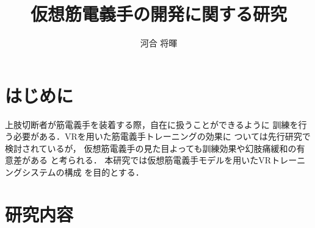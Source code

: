\documentclass{ltjsarticle}
\title{仮想筋電義手の開発に関する研究}
\author{河合 将暉}
\begin{document}
\maketitle

\section{はじめに}
	上肢切断者が筋電義手を装着する際，自在に扱うことができるように
	訓練を行う必要がある．VRを用いた筋電義手トレーニングの効果に
	ついては先行研究\cite{ref:1}\cite{ref:2}で検討されているが，
	仮想筋電義手の見た目よっても訓練効果や幻肢痛緩和の有意差がある
	と考られる．
	本研究では仮想筋電義手モデルを用いたVRトレーニングシステムの構成
	を目的とする．
\section{研究内容}
\end{document}
